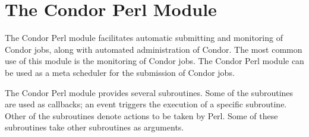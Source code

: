 \section{\label{condor-pm} The Condor Perl Module}

The Condor Perl module facilitates automatic submitting and monitoring of
Condor jobs, along with automated administration of Condor.
The most common
use of this module is the monitoring of Condor jobs.
The Condor Perl module can be used as a meta scheduler for the submission
of Condor jobs.

The Condor Perl module provides several subroutines.
Some of the subroutines are used as callbacks;
an event triggers the execution of a specific subroutine.
Other of the subroutines denote actions to be taken by Perl.
Some of these subroutines take other subroutines as arguments.

